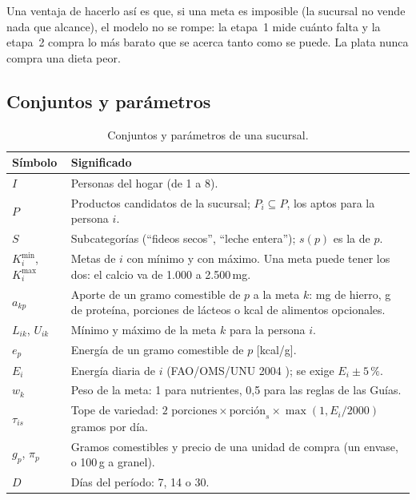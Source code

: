 \documentclass[10pt,a4paper]{article}
\begin{document}
Una ventaja de hacerlo así es que, si una meta es imposible (la sucursal no vende
nada que alcance), el modelo no se rompe: la etapa~1 mide cuánto falta y la etapa~2
compra lo más barato que se acerca tanto como se puede. La plata nunca compra una
dieta peor.

\subsection{Conjuntos y parámetros}

\begin{table}[H]
\centering\small
\caption{Conjuntos y parámetros de una sucursal.}
\label{tab:parametros}
\renewcommand{\arraystretch}{1.2}
\begin{tabularx}{\linewidth}{@{}lX@{}}
\toprule
\textbf{Símbolo} & \textbf{Significado} \\
\midrule
$I$                 & Personas del hogar (de 1 a 8). \\
$P$                 & Productos candidatos de la sucursal; $P_i \subseteq P$, los aptos para la persona $i$. \\
$S$                 & Subcategorías (``fideos secos'', ``leche entera''); $s(p)$ es la de $p$. \\
$K_i^{\min}$, $K_i^{\max}$ & Metas de $i$ con mínimo y con máximo. Una meta puede tener los dos: el calcio va de 1.000 a 2.500\,mg. \\
\midrule
$a_{kp}$            & Aporte de un gramo comestible de $p$ a la meta $k$: mg de hierro, g de proteína, porciones de lácteos o kcal de alimentos opcionales. \\
$L_{ik}$, $U_{ik}$  & Mínimo y máximo de la meta $k$ para la persona $i$. \\
$e_p$               & Energía de un gramo comestible de $p$ [kcal/g]. \\
$E_i$               & Energía diaria de $i$ (FAO/OMS/UNU 2004 \cite{fao}); se exige $E_i \pm 5\,\%$. \\
$w_k$               & Peso de la meta: 1 para nutrientes, 0,5 para las reglas de las Guías. \\
$\tau_{is}$         & Tope de variedad: $2 \text{ porciones} \times \text{porción}_s \times \max(1, E_i / 2000)$ gramos por día. \\
$g_p$, $\pi_p$      & Gramos comestibles y precio de una unidad de compra (un envase, o 100\,g a granel). \\
$D$                 & Días del período: 7, 14 o 30. \\
\bottomrule
\end{tabularx}
\end{table}
\end{document}
